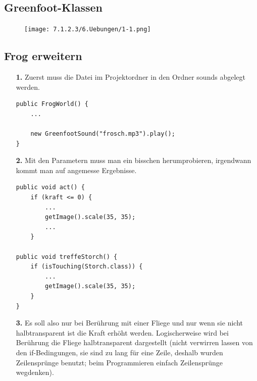 \documentclass{scrartcl}   %
\begin{document}
\subsection{Greenfoot-Klassen}

\begin{figure}[ht]
    \centering
	\texttt{[image: 7.1.2.3/6.Uebungen/1-1.png]}
\end{figure}

\newpage

\subsection{Frog erweitern}

\begin{itemize}
    \item[\textbf{1.}] Zuerst muss die Datei im Projektordner in den Ordner \glqq sounds\grqq{} abgelegt werden.\\
    \begin{lstlisting}
public FrogWorld() {    
    ...
    
    new GreenfootSound("frosch.mp3").play();
}
    \end{lstlisting}
    \item[\textbf{2.}] Mit den Parametern muss man ein bisschen herumprobieren, irgendwann kommt man auf angemesse Ergebnisse.\\
    \begin{lstlisting}
public void act() {
    if (kraft <= 0) {
        ...
        getImage().scale(35, 35);
        ...
    }

public void treffeStorch() {
    if (isTouching(Storch.class)) {
        ...
        getImage().scale(35, 35);
    }
}
    \end{lstlisting}
    \item[\textbf{3.}] Es soll also nur bei Berührung mit einer Fliege und nur wenn sie nicht halbtransparent ist die Kraft erhöht werden. Logischerweise wird bei Berührung die Fliege halbtransparent dargestellt (nicht verwirren lassen von den if-Bedingungen, sie sind zu lang für eine Zeile, deshalb wurden Zeilensprünge benutzt; beim Programmieren einfach Zeilensprünge wegdenken).
    
    \newpage
    

\end{itemize}
\end{document}
